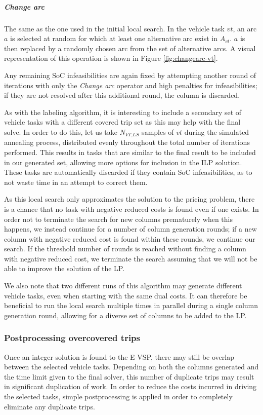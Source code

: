 \documentclass[]{article}
\begin{document}
\subparagraph{Change arc} The same as the one used in the initial local search. In the vehicle task $vt$, an arc $a$ is selected at random for which at least one alternative arc exist in $A_{vt}$. $a$ is then replaced by a randomly chosen arc from the set of alternative arcs. A visual representation of this operation is shown in Figure \ref{fig:changearc-vt}. 

\noindent Any remaining SoC infeasibilities are again fixed by attempting another round of iterations with only the \textit{Change arc} operator and high penalties for infeasibilities; if they are not resolved after this additional round, the column is discarded. 

As with the labeling algorithm, it is interesting to include a secondary set of vehicle tasks with a different covered trip set as this may help with the final solve. In order to do this, let us take $N_{\textit{VT,LS}}$ samples of $vt$ during the simulated annealing process, distributed evenly throughout the total number of iterations performed. This results in tasks that are similar to the final result to be included in our generated set, allowing more options for inclusion in the ILP solution. These tasks are automatically discarded if they contain SoC infeasibilities, as to not waste time in an attempt to correct them.

As this local search only approximates the solution to the pricing problem, there is a chance that no task with negative reduced costs is found even if one exists. In order not to terminate the search for new columns prematurely when this happens, we instead continue for a number of column generation rounds; if a new column with negative reduced cost is found within these rounds, we continue our search. If the threshold number of rounds is reached without finding a column with negative reduced cost, we terminate the search assuming that we will not be able to improve the solution of the LP.

We also note that two different runs of this algorithm may generate different vehicle tasks, even when starting with the same dual costs. It can therefore be beneficial to run the local search multiple times in parallel during a single column generation round, allowing for a diverse set of columns to be added to the LP. 

\subsubsection{Postprocessing overcovered trips} \label{sec:evsp-postprocessing}
Once an integer solution is found to the E-VSP, there may still be overlap between the selected vehicle tasks. Depending on both the columns generated and the time limit given to the final solver, this number of duplicate trips may result in significant duplication of work. In order to reduce the costs incurred in driving the selected tasks, simple postprocessing is applied in order to completely eliminate any duplicate trips. 
\end{document}
